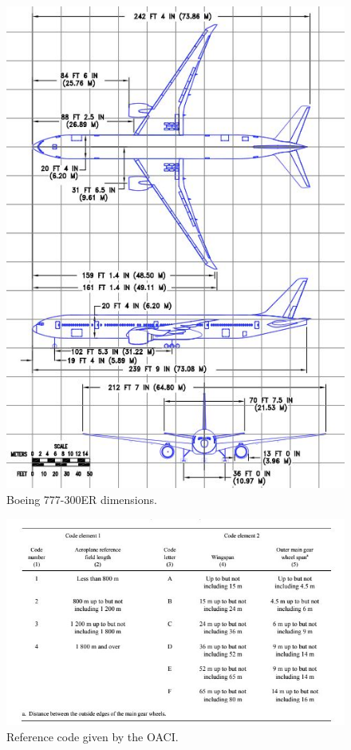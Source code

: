 			\begin{figure}[H]
				\centering
				\includegraphics[clip, trim=0cm 0cm 0cm 0cm, width=1\textwidth]{./images/B777/Dimensions777}
				\caption{Boeing 777-300ER dimensions.} %
				\label{} %
			\end{figure}
				
			\begin{figure}[H]
				\centering
				\includegraphics[clip, trim=0cm 0cm 0cm 0cm, width=1\textwidth]{./images/Annex14/Referencecode}
				\caption{Reference code given by the OACI.} %
				\label{} %
			\end{figure}
		
